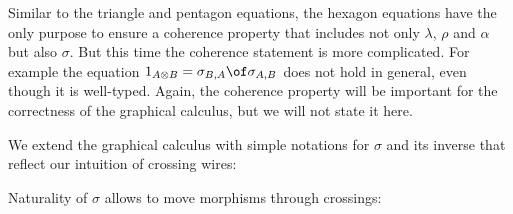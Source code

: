 \documentclass{article}
\theoremstyle{plain}
\theoremstyle{definition}
\begin{document}
  Similar to the triangle and pentagon equations, the hexagon equations have the only purpose to ensure a coherence property that includes not only $\lambda$, $\rho$ and $\alpha$ but also $\sigma$.
  But this time the coherence statement is more complicated.
  For example the equation $1_{A \otimes B} = \sigma_{B, A} \of \sigma_{A, B}$ does not hold in general, even though it is well-typed.
  Again, the coherence property will be important for the correctness of the graphical calculus, but we will not state it here.
  
  We extend the graphical calculus with simple notations for $\sigma$ and its inverse that reflect our intuition of crossing wires:
  
  Naturality of $\sigma$ allows to move morphisms through crossings:
  
\end{document}
